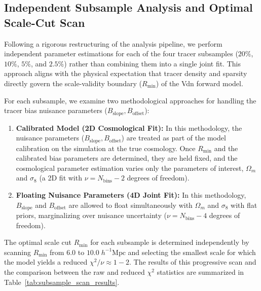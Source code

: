 \documentclass[12pt]{report}
\begin{document}
\subsection{Independent Subsample Analysis and Optimal Scale-Cut Scan}
\label{sec:independent_subsample_analysis}

Following a rigorous restructuring of the analysis pipeline, we perform independent parameter estimations for each of the four tracer subsamples ($20\%$, $10\%$, $5\%$, and $2.5\%$) rather than combining them into a single joint fit. This approach aligns with the physical expectation that tracer density and sparsity directly govern the scale-validity boundary ($R_{\mathrm{min}}$) of the Vdn forward model.

For each subsample, we examine two methodological approaches for handling the tracer bias nuisance parameters ($B_{\mathrm{slope}}, B_{\mathrm{offset}}$):
\begin{enumerate}
    \item \textbf{Calibrated Model (2D Cosmological Fit):} In this methodology, the nuisance parameters ($B_{\mathrm{slope}}, B_{\mathrm{offset}}$) are treated as part of the model calibration on the simulation at the true cosmology. Once $R_{\mathrm{min}}$ and the calibrated bias parameters are determined, they are held fixed, and the cosmological parameter estimation varies only the parameters of interest, $\Omega_m$ and $\sigma_8$ (a 2D fit with $\nu = N_{\mathrm{bins}} - 2$ degrees of freedom).
    \item \textbf{Floating Nuisance Parameters (4D Joint Fit):} In this methodology, $B_{\mathrm{slope}}$ and $B_{\mathrm{offset}}$ are allowed to float simultaneously with $\Omega_m$ and $\sigma_8$ with flat priors, marginalizing over nuisance uncertainty ($\nu = N_{\mathrm{bins}} - 4$ degrees of freedom).
\end{enumerate}

The optimal scale cut $R_{\mathrm{min}}$ for each subsample is determined independently by scanning $R_{\mathrm{min}}$ from $6.0$ to $10.0\;h^{-1}\mathrm{Mpc}$ and selecting the smallest scale for which the model yields a reduced $\chi^2/\nu \approx 1 - 2$. The results of this progressive scan and the comparison between the raw and reduced $\chi^2$ statistics are summarized in Table~\ref{tab:subsample_scan_results}.
\end{document}
